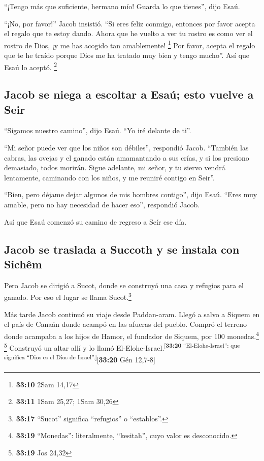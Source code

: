  ``¡Tengo más que suficiente, hermano mío! Guarda lo que
tienes'', dijo Esaú.

 ``¡No, por favor!'' Jacob insistió. ``Si eres feliz
conmigo, entonces por favor acepta el regalo que te estoy dando. Ahora
que he vuelto a ver tu rostro es como ver el rostro de Dios, ¡y me has
acogido tan amablemente! \footnote{\textbf{33:10} 2Sam 14,17}
 Por favor, acepta el regalo que te he traído porque Dios
me ha tratado muy bien y tengo mucho''. Así que Esaú lo aceptó.
\footnote{\textbf{33:11} 1Sam 25,27; 1Sam 30,26}

\hypertarget{jacob-se-niega-a-escoltar-a-esauxfa-esto-vuelve-a-seir}{%
\subsection{Jacob se niega a escoltar a Esaú; esto vuelve a
Seir}\label{jacob-se-niega-a-escoltar-a-esauxfa-esto-vuelve-a-seir}}

 ``Sigamos nuestro camino'', dijo Esaú. ``Yo iré delante
de ti''.

 ``Mi señor puede ver que los niños son débiles'',
respondió Jacob. ``También las cabras, las ovejas y el ganado están
amamantando a sus crías, y si los presiono demasiado, todos morirán.
 Sigue adelante, mi señor, y tu siervo vendrá lentamente,
caminando con los niños, y me reuniré contigo en Seir''.

 ``Bien, pero déjame dejar algunos de mis hombres
contigo'', dijo Esaú. ``Eres muy amable, pero no hay necesidad de hacer
eso'', respondió Jacob.

 Así que Esaú comenzó su camino de regreso a Seír ese
día.

\hypertarget{jacob-se-traslada-a-succoth-y-se-instala-con-sichuxeam}{%
\subsection{Jacob se traslada a Succoth y se instala con
Sichêm}\label{jacob-se-traslada-a-succoth-y-se-instala-con-sichuxeam}}

 Pero Jacob se dirigió a Sucot, donde se construyó una
casa y refugios para el ganado. Por eso el lugar se llama
Sucot.\footnote{\textbf{33:17} ``Sucot'' significa ``refugios'' o
  ``establos''.}

 Más tarde Jacob continuó su viaje desde Paddan-aram.
Llegó a salvo a Siquem en el país de Canaán donde acampó en las afueras
del pueblo.  Compró el terreno donde acampaba a los hijos
de Hamor, el fundador de Siquem, por 100 monedas.\footnote{\textbf{33:19}
  ``Monedas'': literalmente, ``kesitah'', cuyo valor es desconocido.}
\footnote{\textbf{33:19} Jos 24,32}  Construyó un altar
allí y lo llamó El-Elohe-Israel.\textsuperscript{{[}\textbf{33:20}
``El-Elohe-Israel'': que significa ``Dios es el Dios de
Israel''.{]}}{[}\textbf{33:20} Gén 12,7-8{]}

